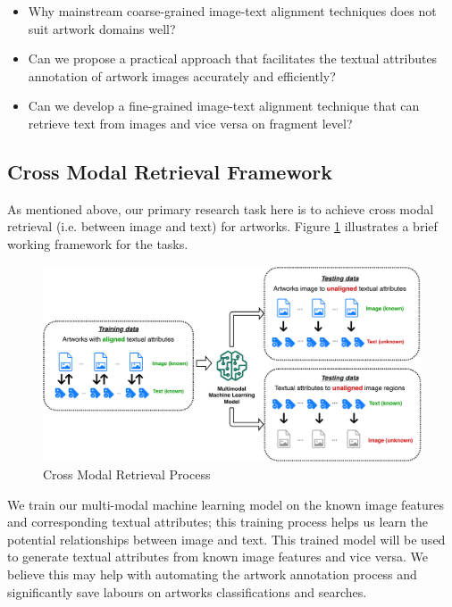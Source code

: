 \begin{itemize}
    \item Why mainstream coarse-grained image-text alignment techniques does not suit artwork domains well?
    \item Can we propose a practical approach that facilitates the textual attributes annotation of artwork images accurately and efficiently?
    \item Can we develop a fine-grained image-text alignment technique that can retrieve text from images and vice versa on fragment level?
\end{itemize}

\subsection{Cross Modal Retrieval Framework}

As mentioned above, our primary research task here is to achieve cross modal retrieval (i.e. between image and text) for artworks. Figure \ref{fig:framework} illustrates a brief working framework for the tasks.

\begin{figure}[h!]
\centering
\includegraphics[width=\textwidth]{framework.pdf}
\caption{Cross Modal Retrieval Process}
\label{fig:framework}
\end{figure}

We train our multi-modal machine learning model on the known image features and corresponding textual attributes; this training process helps us learn the potential relationships between image and text. This trained model will be used to generate textual attributes from known image features and vice versa. We believe this may help with automating the artwork annotation process and significantly save labours on artworks classifications and searches.


